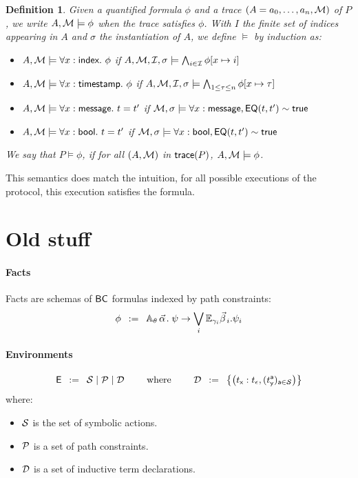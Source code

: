 \documentclass[a4paper]{article}
\newtheorem{definition}{Definition}
\theoremstyle{remark}
\begin{document}
\begin{definition}
  Given a quantified formula $\phi$ and a trace $(A=a_0,\dots,a_n,\mathcal{M})$ of $P$, we write $A, \mathcal{M} \models \phi$ when the trace satisfies $\phi$. With $I$ the finite set of indices appearing in $A$ and $\sigma$ the instantiation of $A$, we define $\models$ by induction as:
  \begin{itemize}
  \item $A,\M \models \forall x:\idx.\ \phi$ if $A,\mathcal{M}, \mathcal{I},\sigma \models \bigwedge_{i\in \mathcal{I}} \phi[x \mapsto i]$

  \item $A,\mathcal{M} \models \forall x:\textsf{timestamp}.\ \phi$ if $A,\mathcal{M}, \mathcal{I},\sigma \models \bigwedge_{1 \leq \tau \leq n} \phi[x \mapsto \tau]$
  \item $A,\mathcal{M} \models \forall x:\textsf{message}.\ t= t' $ if $\mathcal{M}, \sigma \models \forall x:\textsf{message}, \textsf{EQ}(t,t') \sim \textsf{true}$
  \item $A,\mathcal{M} \models \forall x:\textsf{bool}.\ t= t' $ if $\mathcal{M}, \sigma \models \forall x:\textsf{bool}, \textsf{EQ}(t,t') \sim \textsf{true}$
  \end{itemize}

We say that $P \models \phi$, if for all $(A,\mathcal{M})$ in $\textsf{trace}(P)$, $A, \mathcal{M} \models \phi$.

\end{definition}

This semantics does match the intuition, for all possible executions of the protocol, this execution satisfies the formula.


\newpage
\section{Old stuff}



\paragraph{Facts}
Facts are schemas of $\textsf{BC}$ formulas indexed by path constraints:
\[
  \phi \mdef
  \cforall_\theta\, \valpha.\;
  \psi
  \ra
  \bigvee_{i}
  \cexists_\gammai \vbetai. \psi_i
\]

\paragraph{Environments}
\[
  \textsf{E} \;\;\mathbin{:=}\;\;
  \mathcal{S} \mid
  \mathcal{P} \mid
  \mathcal{D}
  \qquad
  \text{ where }
  \qquad
  \mathcal{D} \;\;\mathbin{:=}\;\;
  \left\{
    \left(t_{\textsf{x}} : t_\epsilon,(t_{\textsf{y}}^{\textsf{a}})_{{\textsf{a}} \in \mathcal{S}}\right)
  \right\}
\]
where:
\begin{itemize}
\item $\mathcal{S}$ is the set of symbolic actions.
\item $\mathcal{P}$ is a set of path constraints.
\item $\mathcal{D}$ is a set of inductive term declarations.
\end{itemize}
\end{document}
